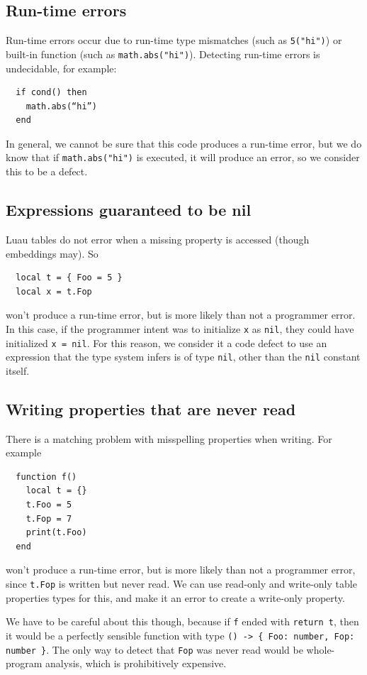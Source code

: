 \documentclass[sigplan]{acmart}
\begin{document}
\subsection{Run-time errors}

Run-time errors occur due to run-time type mismatches (such as \verb|5("hi")|)
or built-in function (such as \verb|math.abs("hi")|).
Detecting run-time errors is undecidable, for example:
\begin{verbatim}
  if cond() then
    math.abs(“hi”)
  end
\end{verbatim}
In general, we cannot be sure that this code produces a run-time
error, but we do know that if \verb|math.abs("hi")| is executed, it
will produce an error, so we consider this to be a defect.

\subsection{Expressions guaranteed to be nil}

Luau tables do not error when a missing property is accessed (though embeddings may). So
\begin{verbatim}
  local t = { Foo = 5 }
  local x = t.Fop
\end{verbatim}
won’t produce a run-time error, but is more likely than not a
programmer error. In this case, if the programmer intent was to
initialize \verb|x| as \verb|nil|, they could have initialized
\verb|x = nil|.  For this reason, we consider it a code defect to use
an expression that the type system infers is of type \verb|nil|, other
than the \verb|nil| constant itself.

\subsection{Writing properties that are never read}

There is a matching problem with misspelling properties when writing. For example
\begin{verbatim}
  function f()
    local t = {}
    t.Foo = 5
    t.Fop = 7
    print(t.Foo)
  end
\end{verbatim}
won’t produce a run-time error, but is more likely than not a
programmer error, since \verb|t.Fop| is written but never read. We can use
read-only and write-only table properties types for this, and make it an
error to create a write-only property.

We have to be careful about this though, because if \verb|f| ended
with \verb|return t|, then it would be a perfectly sensible function
with type \verb|() -> { Foo: number, Fop: number }|. The only way to detect
that \verb|Fop| was never read would be whole-program analysis, which is
prohibitively expensive.
\end{document}
